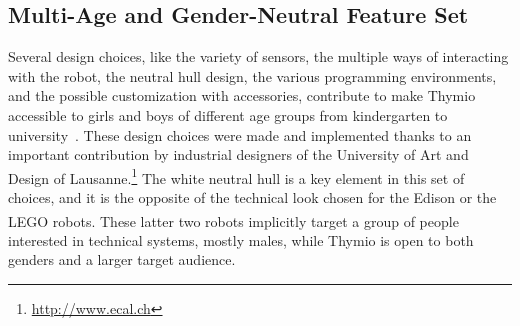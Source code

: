 \documentclass[letterpaper, 10 pt, conference]{ieeeconf}  %
\begin{document}

\subsection{Multi-Age and Gender-Neutral Feature Set}
\label{sec:multi}

Several design choices, like the variety of sensors, the multiple ways of interacting with the robot, the neutral hull design, the various programming environments, and the possible customization with accessories, contribute to make Thymio accessible to girls and boys of different age groups from kindergarten to university~\cite{Riedo2013}.
These design choices were made and implemented thanks to an important contribution by industrial designers of the University of Art and Design of Lausanne.\footnote{\url{http://www.ecal.ch}}
The white neutral hull is a key element in this set of choices, and it is the opposite of the technical look chosen for the Edison or the LEGO\textsuperscript{\textregistered} robots. 
These latter two robots implicitly target a group of people interested in technical systems, mostly males, while Thymio is open to both genders and a larger target audience.
\end{document}
